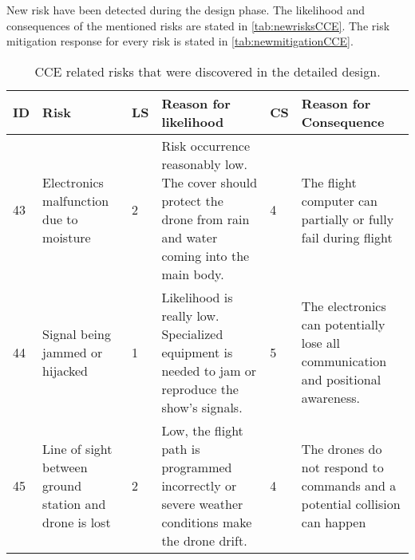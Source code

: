 New risk have been detected during the design phase. The likelihood and consequences of the mentioned risks are stated in \autoref{tab:newrisksCCE}. The risk mitigation response for every risk is stated in \autoref{tab:newmitigationCCE}.


\begin{table}[H]
\centering
\caption{CCE related risks that were discovered in the detailed design.}
\label{tab:newrisksCCE}
\begin{scriptsize}
\begin{tabular}{|p{0.4cm}|p{3cm}|p{0.4cm}|p{4.5cm}|p{0.4cm}|p{4.5cm}|}
\hline
\textbf{ID} & \textbf{Risk} & \textbf{LS} & \textbf{Reason for likelihood} & \textbf{CS} & \textbf{Reason for Consequence} \\ 
\hline
43 & Electronics malfunction due to moisture & 2 & Risk occurrence reasonably low. The cover should protect the drone from rain and water coming into the main body. & 4 & The flight computer can partially or fully fail during flight
\\ \hline
44 & Signal being jammed or hijacked & 1 & Likelihood is really low. Specialized equipment is needed to jam or reproduce the show's signals. & 5 & The electronics can potentially lose all communication and positional awareness.
\\ \hline
45 & Line of sight between ground station and drone is lost & 2 & Low, the flight path is programmed incorrectly or severe weather conditions make the drone drift. & 4 & The drones do not respond to commands and a potential collision can happen
\\ \hline
\end{tabular}
\end{scriptsize}
\end{table}



